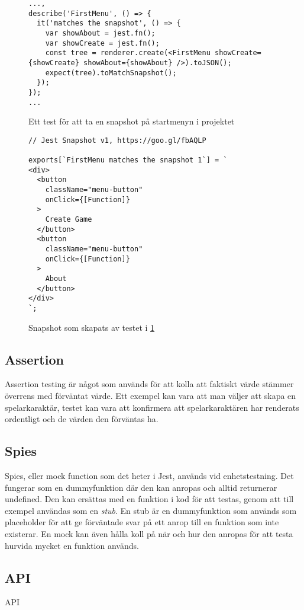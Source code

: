 \lstset{language=JavaScript}
\begin{figure}[h]
  \center
  \begin{minipage}[c]{5cm}
    \begin{lstlisting}
...,
describe('FirstMenu', () => {
  it('matches the snapshot', () => {
    var showAbout = jest.fn();
    var showCreate = jest.fn();
    const tree = renderer.create(<FirstMenu showCreate={showCreate} showAbout={showAbout} />).toJSON();
    expect(tree).toMatchSnapshot();
  });
});
...
    \end{lstlisting}
  \end{minipage}

  \caption{Ett test för att ta en snapshot på startmenyn i projektet}
  \label{fig:snapshot-test}
\end{figure}


\lstset{language=Java}
\begin{figure}[h]
  \center
  \begin{minipage}[c]{5cm}
    \begin{lstlisting}
// Jest Snapshot v1, https://goo.gl/fbAQLP

exports[`FirstMenu matches the snapshot 1`] = `
<div>
  <button
    className="menu-button"
    onClick={[Function]}
  >
    Create Game
  </button>
  <button
    className="menu-button"
    onClick={[Function]}
  >
    About
  </button>
</div>
`;

    \end{lstlisting}
  \end{minipage}

  \caption{Snapshot som skapats av testet i \ref{fig:snapshot-test}}
  \label{fig:snapshot-shot}
\end{figure}

\subsection{Assertion}
Assertion testing är något som används för att kolla att faktiskt värde stämmer överrens med förväntat värde. Ett exempel kan vara att man väljer att skapa en spelarkaraktär, testet kan vara att konfirmera att spelarkaraktären har renderats ordentligt och de värden den förväntas ha. 
\subsection{Spies}
Spies, eller mock function\cite{bib-mock} som det heter i Jest, används vid enhetstestning. Det fungerar som en dummyfunktion där den kan anropas och alltid returnerar undefined. Den kan ersättas med en funktion i kod för att testas, genom att till exempel användas som en \textit{stub}. En stub är en dummyfunktion som används som placeholder för att ge förväntade svar på ett anrop till en funktion som inte existerar. En mock kan även hålla koll på när och hur den anropas för att testa hurvida mycket en funktion används.
\subsection{API}
API
